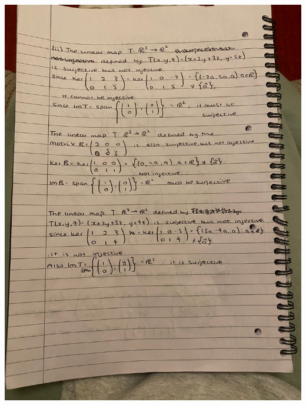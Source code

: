 \documentclass{article}
\begin{document}
\includegraphics[scale = 0.2]{IMG-20231126-WA0005.jpg}
\end{document}
